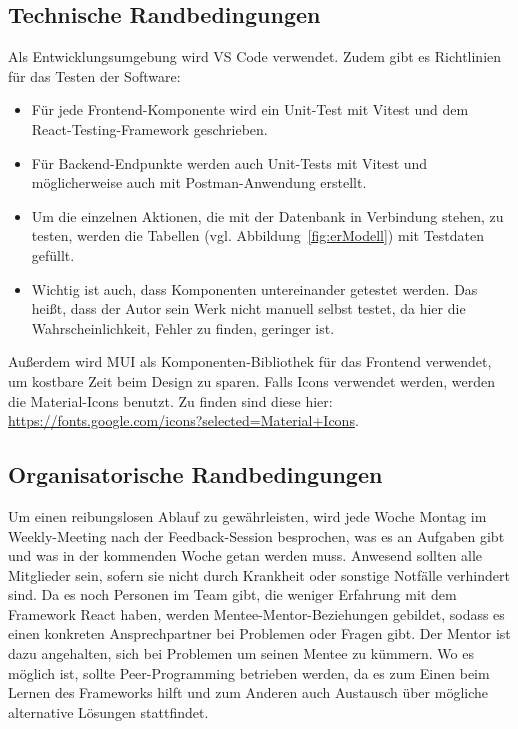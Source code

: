 \documentclass[conference]{IEEEtran}
\begin{document}
\subsection{Technische Randbedingungen}
Als Entwicklungsumgebung wird VS Code verwendet.
Zudem gibt es Richtlinien für das Testen der Software:
\begin{itemize}
    \item Für jede Frontend-Komponente wird ein \gls{Unit-Test} mit \gls{Vitest} und dem React-Testing-Framework geschrieben.
    \item Für Backend-Endpunkte werden auch Unit-Tests mit Vitest und möglicherweise auch mit \gls{Postman}-Anwendung erstellt.
    \item Um die einzelnen Aktionen, die mit der Datenbank in Verbindung stehen, zu testen, werden die Tabellen (vgl. Abbildung~\ref{fig:erModell}) mit Testdaten gefüllt.
    \item Wichtig ist auch, dass Komponenten untereinander getestet werden. Das heißt, dass der Autor sein Werk nicht manuell selbst testet, da hier die Wahrscheinlichkeit, Fehler zu finden, geringer ist.
\end{itemize}
Außerdem wird MUI als Komponenten-Bibliothek für das Frontend verwendet, um kostbare Zeit beim Design zu sparen.
Falls Icons verwendet werden, werden die Material-Icons benutzt. Zu finden sind diese hier: \url{https://fonts.google.com/icons?selected=Material+Icons}.
\subsection{Organisatorische Randbedingungen}
Um einen reibungslosen Ablauf zu gewährleisten, wird jede Woche Montag im \gls{Weekly-Meeting} nach der Feedback-Session besprochen, was es an Aufgaben gibt und was in der kommenden Woche getan werden muss.
Anwesend sollten alle Mitglieder sein, sofern sie nicht durch Krankheit oder sonstige Notfälle verhindert sind.
Da es noch Personen im Team gibt, die weniger Erfahrung mit dem Framework React haben, werden \gls{Mentee}-\gls{Mentor}-Beziehungen gebildet, sodass es einen konkreten Ansprechpartner bei Problemen oder Fragen gibt.
Der Mentor ist dazu angehalten, sich bei Problemen um seinen Mentee zu kümmern.
Wo es möglich ist, sollte \gls{Peer-Programming} betrieben werden, da es zum Einen beim Lernen des Frameworks hilft und zum Anderen auch Austausch über mögliche alternative Lösungen stattfindet.
\end{document}
